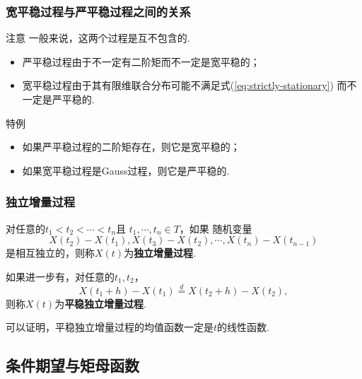 \begin{frame}\label{frame:wide-stationary-strict-stationary}
    \frametitle{宽平稳过程与严平稳过程之间的关系}
    \begin{alertblock}{注意}
        一般来说，这两个过程是互不包含的.

        \begin{itemize}
            \item 严平稳过程由于不一定有二阶矩而不一定是宽平稳的；
            \item 宽平稳过程由于其有限维联合分布可能不满足式(\ref{eq:strictly-stationary})
                    而不一定是严平稳的. 
        \end{itemize}
        
        
    \end{alertblock}
    \begin{exampleblock}{特例}
        \begin{itemize}
            \item 如果严平稳过程的二阶矩存在，则它是宽平稳的；
            \item 如果宽平稳过程是Gauss过程，则它是严平稳的. 
        \end{itemize}
    \end{exampleblock}
\end{frame}

\begin{frame}
    \frametitle{独立增量过程}
    \begin{mydefinition}[独立增量过程与平稳独立增量过程]\label{def:independent-increment-process}
        对任意的$t_1<t_2<\cdots<t_n$且
        $t_1,\cdots,t_n\in T$，如果
        随机变量
        $$
            X(t_2)-X(t_1),X(t_3)-X(t_2),\cdots,X(t_n)-X(t_{n-1})
        $$
        是相互独立的，则称$X(t)$为\textbf{独立增量过程}.
        
        如果进一步有，对任意的$t_1,t_2$，
        \begin{equation*}
            X(t_1+h)-X(t_1)\overset{d}{=}X(t_2+h)-X(t_2),
        \end{equation*}
        则称$X(t)$为\textbf{平稳独立增量过程}. 
    \end{mydefinition}
    \begin{myproposition}
        可以证明，平稳独立增量过程的均值函数一定是$t$的线性函数. 
    \end{myproposition}
\end{frame}

\subsection{条件期望与矩母函数}

